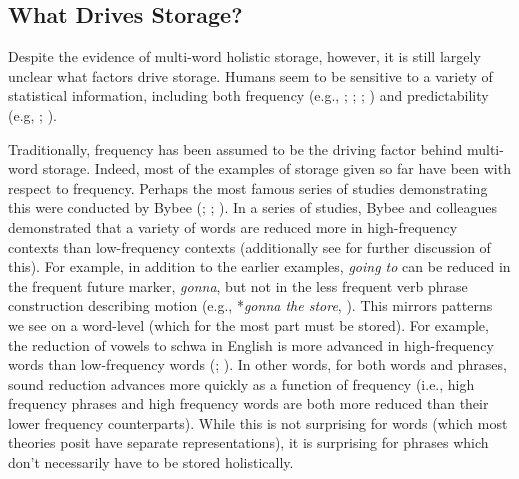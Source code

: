 \documentclass[
  12pt,
  letterpaper,
]{scrreprt}
\begin{document}
\subsection{What Drives Storage?}\label{what-drives-storage}

Despite the evidence of multi-word holistic storage, however, it is
still largely unclear what factors drive storage. Humans seem to be
sensitive to a variety of statistical information, including both
frequency (e.g., ;
;
; ) and predictability (e.g,
;
).

Traditionally, frequency has been assumed to be the driving factor
behind multi-word storage. Indeed, most of the examples of storage given
so far have been with respect to frequency. Perhaps the most famous
series of studies demonstrating this were conducted by Bybee
(; ; ). In a series of studies, Bybee and colleagues
demonstrated that a variety of words are reduced more in high-frequency
contexts than low-frequency contexts (additionally see
 for further discussion of this). For example, in addition to the
earlier examples, \emph{going to} can be reduced in the frequent future
marker, \emph{gonna}, but not in the less frequent verb phrase
construction describing motion (e.g., *\emph{gonna the store},
). This mirrors patterns we see on
a word-level (which for the most part must be stored). For example, the
reduction of vowels to schwa in English is more advanced in
high-frequency words than low-frequency words
(;
). In other
words, for both words and phrases, sound reduction advances more quickly
as a function of frequency (i.e., high frequency phrases and high
frequency words are both more reduced than their lower frequency
counterparts). While this is not surprising for words (which most
theories posit have separate representations), it is surprising for
phrases which don't necessarily have to be stored holistically.
\end{document}
